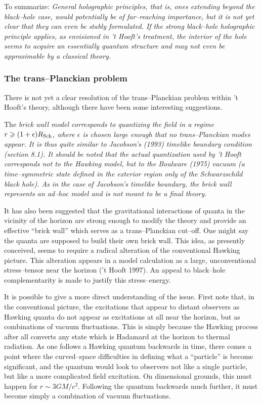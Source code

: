 To summarize:  
\it General \rm holographic principles, that is, ones 
extending beyond the black--hole case, would potentially be of
far--reaching importance, but it is not yet clear that they can even be
stably formulated.  If the \it strong black--hole \rm
holographic principle applies, as envisioned in 't Hooft's treatment,
the interior of the hole seems to acquire an essentially quantum
structure and may not even be approximable by a classical theory.

\subsubsection{The trans--Planckian problem}

There is not yet a clear resolution of the trans--Planckian problem
within 't Hooft's theory, although there have been some interesting
suggestions.

The \it brick wall model \rm corresponds to quantizing the field in a
regime $r\geq (1+\epsilon) R_{\rm Sch}$, where $\epsilon$ is chosen
large enough that no trans--Planckian modes appear.  It is thus quite
similar to Jacobson's (1993) timelike boundary condition (section 8.1).  
It should
be noted that the actual quantization used by 't Hooft corresponds not
to the Hawking model, but to the \it Boulware \rm (1975) vacuum (a
time--symmetric state defined in the exterior region only of the
Schwarzschild black hole).
As in the case of Jacobson's timelike boundary, the brick wall represents an
ad--hoc model and is not meant to be a final theory.

It has also been suggested that the gravitational interactions of
quanta in the vicinity of the horizon are strong enough to modify the
theory and provide an effective ``brick wall'' which serves as a
trans--Planckian cut--off.  
One might say the quanta are supposed to build their own brick
wall.
This idea, as presently conceived, seems
to require a radical alteration of the conventional 
Hawking picture.  This
alteration appears in a model calculation as a large,
unconventional stress--tensor near the horizon ('t Hooft 1997).  
An appeal to black--hole complementarity is made to justify this
stress--energy.

It is
possible to give a more direct understanding of the issue.
First note that,
in the conventional picture, the excitations that
appear to distant observers as Hawking quanta do not appear as
excitations at all near the horizon, but as combinations of vacuum
fluctuations. 
This is simply because the Hawking process after all converts any
state which is Hadamard at the horizon to thermal radiation.
As one follows a Hawking quantum backwards in time, there comes a
point where the curved--space
difficulties in defining what a ``particle'' is become
significant, and the quantum would look to observers not like a single
particle, but like a more complicated field excitation.  On
dimensional grounds, this must happen for $r\sim 3GM/c^2$.  Following
the quantum backwards much further, it must become simply a
combination of vacuum fluctuations. 

